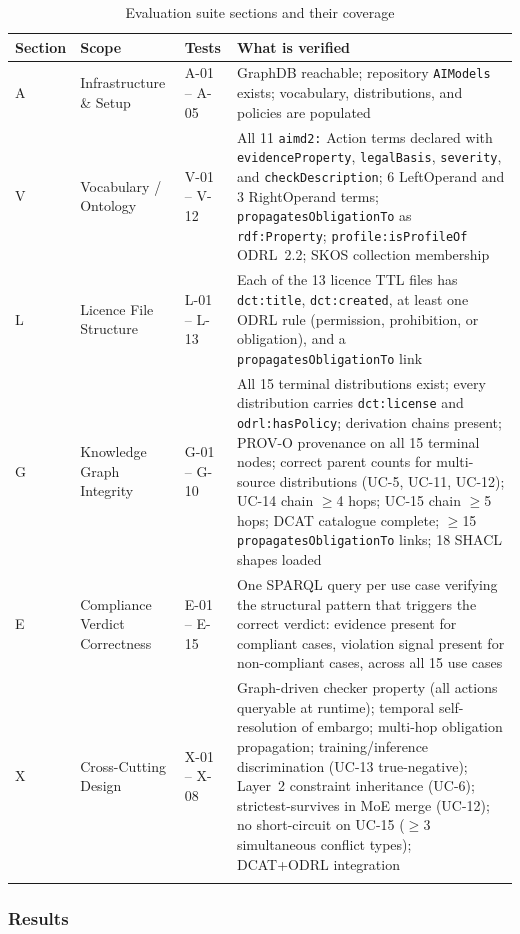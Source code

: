 \documentclass[12pt,a4paper]{article}
\begin{document}
\begin{longtable}{@{}p{1.5cm}p{4.5cm}p{2cm}p{5.6cm}@{}}
\toprule
\textbf{Section} & \textbf{Scope} & \textbf{Tests} & \textbf{What is verified} \\
\midrule
\endhead
A & Infrastructure \& Setup       & A-01 -- A-05  & GraphDB reachable; repository \texttt{AIModels} exists; vocabulary, distributions, and policies are populated \\[4pt]
V & Vocabulary / Ontology         & V-01 -- V-12  & All 11 \texttt{aimd2:} Action terms declared with \texttt{evidenceProperty}, \texttt{legalBasis}, \texttt{severity}, and \texttt{checkDescription}; 6 LeftOperand and 3 RightOperand terms; \texttt{propagatesObligationTo} as \texttt{rdf:Property}; \texttt{profile:isProfileOf} ODRL~2.2; SKOS collection membership \\[4pt]
L & Licence File Structure        & L-01 -- L-13  & Each of the 13 licence TTL files has \texttt{dct:title}, \texttt{dct:created}, at least one ODRL rule (permission, prohibition, or obligation), and a \texttt{propagatesObligationTo} link \\[4pt]
G & Knowledge Graph Integrity     & G-01 -- G-10  & All 15 terminal distributions exist; every distribution carries \texttt{dct:license} and \texttt{odrl:hasPolicy}; derivation chains present; PROV-O provenance on all 15 terminal nodes; correct parent counts for multi-source distributions (UC-5, UC-11, UC-12); UC-14 chain $\geq$4 hops; UC-15 chain $\geq$5 hops; DCAT catalogue complete; $\geq$15 \texttt{propagatesObligationTo} links; 18 SHACL shapes loaded \\[4pt]
E & Compliance Verdict Correctness & E-01 -- E-15  & One SPARQL query per use case verifying the structural pattern that triggers the correct verdict: evidence present for compliant cases, violation signal present for non-compliant cases, across all 15 use cases \\[4pt]
X & Cross-Cutting Design          & X-01 -- X-08  & Graph-driven checker property (all actions queryable at runtime); temporal self-resolution of embargo; multi-hop obligation propagation; training/inference discrimination (UC-13 true-negative); Layer~2 constraint inheritance (UC-6); strictest-survives in MoE merge (UC-12); no short-circuit on UC-15 ($\geq$3 simultaneous conflict types); DCAT+ODRL integration \\
\bottomrule
\caption{Evaluation suite sections and their coverage}
\end{longtable}

\subsubsection*{Results}
\end{document}
